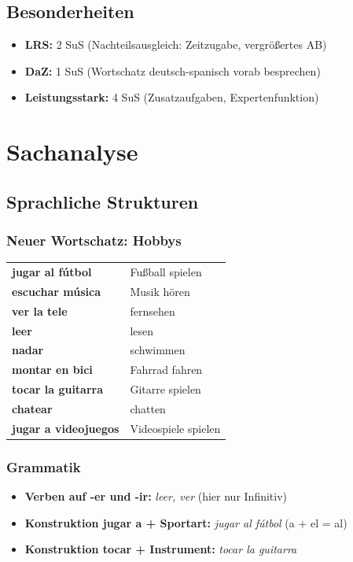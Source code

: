 \documentclass[11pt,a4paper]{article}
\begin{document}
\subsection{Besonderheiten}
\begin{itemize}
    \item \textbf{LRS:} 2 SuS (Nachteilsausgleich: Zeitzugabe, vergrößertes AB)
    \item \textbf{DaZ:} 1 SuS (Wortschatz deutsch-spanisch vorab besprechen)
    \item \textbf{Leistungsstark:} 4 SuS (Zusatzaufgaben, Expertenfunktion)
\end{itemize}

\section{Sachanalyse}

\subsection{Sprachliche Strukturen}

\subsubsection{Neuer Wortschatz: Hobbys}
\begin{tabular}{ll}
\textbf{jugar al fútbol} & Fußball spielen \\
\textbf{escuchar música} & Musik hören \\
\textbf{ver la tele} & fernsehen \\
\textbf{leer} & lesen \\
\textbf{nadar} & schwimmen \\
\textbf{montar en bici} & Fahrrad fahren \\
\textbf{tocar la guitarra} & Gitarre spielen \\
\textbf{chatear} & chatten \\
\textbf{jugar a videojuegos} & Videospiele spielen \\
\end{tabular}

\subsubsection{Grammatik}
\begin{itemize}
    \item \textbf{Verben auf -er und -ir:} \textit{leer, ver} (hier nur Infinitiv)
    \item \textbf{Konstruktion jugar a + Sportart:} \textit{jugar al fútbol} (a + el = al)
    \item \textbf{Konstruktion tocar + Instrument:} \textit{tocar la guitarra}
\end{itemize}
\end{document}
